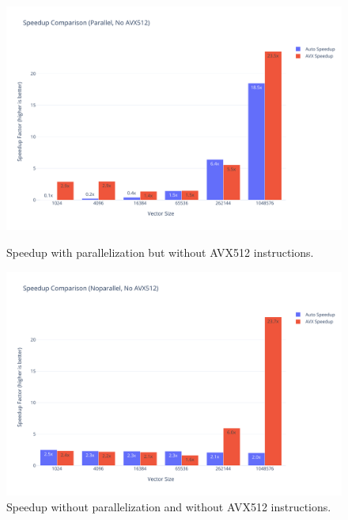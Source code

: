 \documentclass[10pt]{report}
\begin{document}
\begin{figure}[H]
  \centering
  \begin{minipage}{0.49\textwidth}
    \centering
    \includegraphics[width=\textwidth]{../images/speedup/softmax_speedup_parallel_noavx512.pdf}
    \caption{Speedup with parallelization but without AVX512 instructions.}
    \label{fig:speedup_parallel_noavx512}
  \end{minipage}
  \hfill
  \begin{minipage}{0.49\textwidth}
    \centering
    \includegraphics[width=\textwidth]{../images/speedup/softmax_speedup_noparallel_noavx512.pdf}
    \caption{Speedup without parallelization and without AVX512 instructions.}
    \label{fig:speedup_noparallel_noavx512}
  \end{minipage}
\end{figure}
\end{document}
